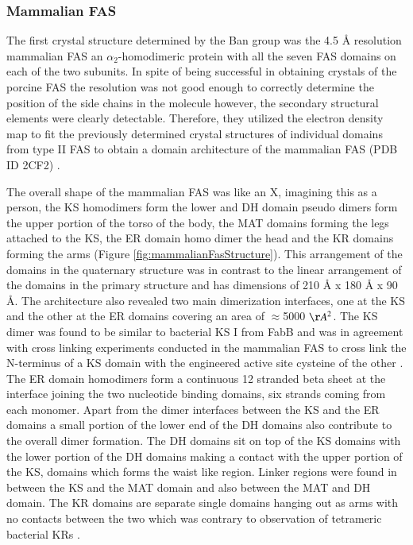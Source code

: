 		\subsubsection{Mammalian FAS}
		\label{sec:mFAS}
		The first crystal structure determined by the Ban group was the 4.5 \AA{} resolution mammalian FAS an  $ \alpha_{2}$-homodimeric protein with all the seven FAS domains on each of the two subunits. In spite of being successful in obtaining crystals of the porcine FAS the resolution was not good enough to correctly determine the position of the side chains in the molecule however, the secondary structural elements were clearly detectable. Therefore, they utilized the electron density map to fit the previously determined crystal structures of individual domains from type II FAS to obtain a domain architecture of the mammalian FAS (PDB ID 2CF2) \parencite{Maier2006}. 
		
		The overall shape of the mammalian FAS was like an X, imagining this as a person, the KS homodimers form the lower and DH domain pseudo dimers form the upper portion of the torso of the body, the MAT domains forming the legs attached to the KS, the ER domain homo dimer the head and the KR domains forming the arms (Figure \ref{fig:mammalianFasStructure}). This arrangement of the domains in the quaternary structure was in contrast to the linear arrangement of the domains in the primary structure and has dimensions of 210 \AA{} x 180 \AA{} x 90 \AA{}. The architecture also revealed two main dimerization interfaces, one at the KS and the other at the ER domains covering an area of $\approx$5000 $ \AA{}^{2} $. The KS dimer was found to be similar to bacterial KS I from FabB and was in agreement with cross linking experiments conducted in the mammalian FAS to cross link the N-terminus of a KS domain with the engineered active site cysteine of the other \parencite{Witkowski2004}. The ER domain homodimers form a continuous 12 stranded beta sheet at the interface joining the two nucleotide binding domains, six strands coming from each monomer. Apart from the dimer interfaces between the KS and the ER domains a small portion of the lower end of the DH domains also contribute to the overall dimer formation. The DH domains sit on top of the KS domains with the lower portion of the DH domains making a contact with the upper portion of the KS, domains which forms the waist like region. Linker regions were found in between the KS and the MAT domain and also between the MAT and DH domain. The KR domains are separate single domains hanging out as arms with no contacts between the two which was contrary to observation of tetrameric bacterial KRs \parencite{Maier2006, Boehringer2013}. 
		
